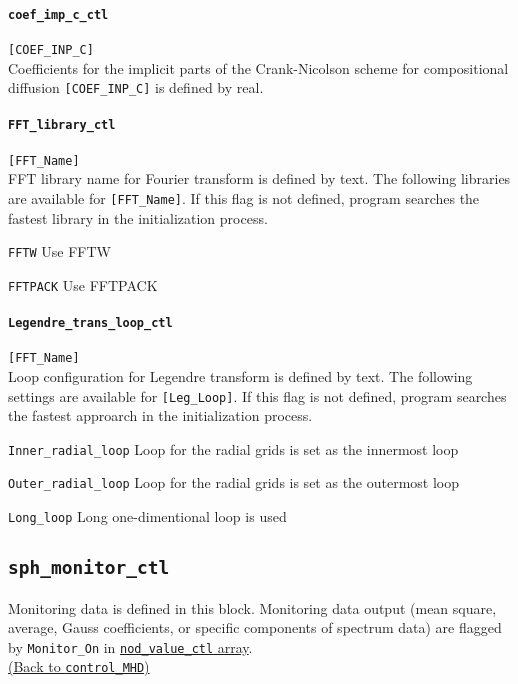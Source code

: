 \paragraph{\tt coef\_imp\_c\_ctl}
\label{href_t:coef_imp_c_ctl}
\verb|[COEF_INP_C]| \\
Coefficients for the implicit parts of the Crank-Nicolson scheme for compositional diffusion \verb|[COEF_INP_C]| is defined by real. 


\paragraph{\tt FFT\_library\_ctl}
\label{href_t:FFT_library_ctl}
\verb|[FFT_Name]| \\
FFT library name for Fourier transform is defined by text. The following libraries are available for \verb|[FFT_Name]|. 
If this flag is not defined, program searches the fastest library in the initialization process.
%
\begin{description}
\item{\tt FFTW}		Use FFTW
\item{\tt FFTPACK}	Use FFTPACK
\end{description}
%

\paragraph{\tt Legendre\_trans\_loop\_ctl}
\label{href_t:Legendre_trans_loop_ctl}
\verb|[FFT_Name]| \\
Loop configuration for Legendre transform is defined by text. The following settings are available for \verb|[Leg_Loop]|. 
If this flag is not defined, program searches the fastest approarch in the initialization process.
%
\begin{description}
\item{\tt Inner\_radial\_loop}	Loop for the radial grids is set as the innermost loop
\item{\tt Outer\_radial\_loop}	Loop for the radial grids is set as the outermost loop
\item{\tt Long\_loop}	        Long one-dimentional loop is used
\end{description}
%

%
\subsection{\tt sph\_monitor\_ctl}
\label{href_t:sph_monitor_ctl}
Monitoring data is defined in this block. Monitoring data output (mean square, average, Gauss coefficients, or specific components of spectrum data) are flagged by {\tt Monitor\_On} in \hyperref[href_t:nod_value_ctl]{ {\tt nod\_value\_ctl} array}. \\
\hyperref[href_i:sph_monitor_ctl]{(Back to {\tt control\_MHD})}

